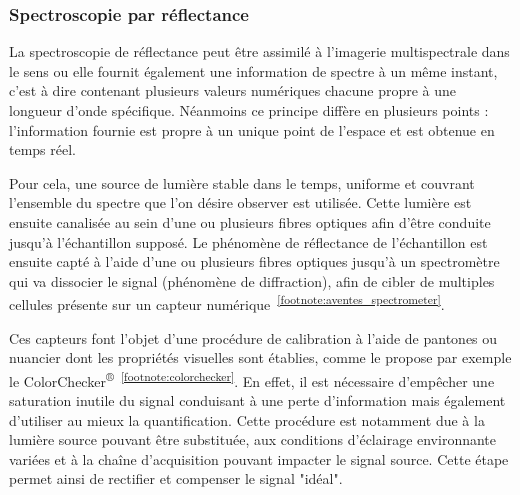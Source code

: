 \subsubsection{Spectroscopie par réflectance}
La spectroscopie de réflectance peut être assimilé à l'imagerie multispectrale dans le sens ou elle fournit également une information de spectre à un même instant, c'est à dire contenant plusieurs valeurs numériques chacune propre à une longueur d'onde spécifique. Néanmoins ce principe diffère en plusieurs points : l'information fournie est propre à un unique point de l'espace et est obtenue en temps réel.\par

Pour cela, une source de lumière stable dans le temps, uniforme et couvrant l'ensemble du spectre que l'on désire observer est utilisée. Cette lumière est ensuite canalisée au sein d'une ou plusieurs fibres optiques afin d'être conduite jusqu'à l'échantillon supposé. Le phénomène de réflectance de l'échantillon est ensuite capté à l'aide d'une ou plusieurs fibres optiques jusqu'à un spectromètre qui va dissocier le signal (phénomène de diffraction), afin de cibler de multiples cellules présente sur un capteur numérique~\cite{Murphy2005,Malla2008}\textsuperscript{\ref{footnote:aventes_spectrometer}}.\par

Ces capteurs font l'objet d'une procédure de calibration à l'aide de pantones ou nuancier dont les propriétés visuelles sont établies, comme le propose par exemple le ColorChecker\textsuperscript{®}~\textsuperscript{\ref{footnote:colorchecker}}. En effet, il est nécessaire d'empêcher une saturation inutile du signal conduisant à une perte d'information mais également d'utiliser au mieux la quantification. Cette procédure est notamment due  à la lumière source pouvant être substituée, aux conditions d'éclairage environnante variées et à la chaîne d'acquisition pouvant impacter le signal source. Cette étape permet ainsi de rectifier et compenser le signal "idéal".\par


